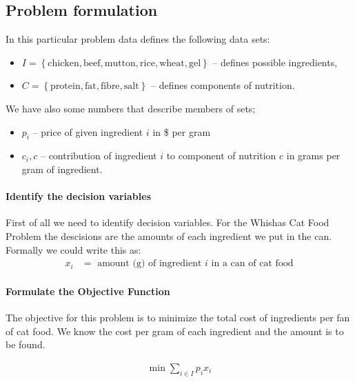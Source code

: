   
\subsection{Problem formulation}

In this particular problem data defines the following data sets:

\begin{itemize}
  \item $I = \left\{\text{chicken}, \text{beef}, \text{mutton}, \text{rice}, \text{wheat}, \text{gel}\right\}$ -- defines possible ingredients,
  \item $C = \left\{\text{protein}, \text{fat}, \text{fibre}, \text{salt}\right\}$ -- defines components of nutrition.
\end{itemize}

We have also some numbers that describe members of sets;
\begin{itemize}
  \item $p_i$ -- price of given ingredient $i$ in \$ per gram
  \item $c_i,c$ -- contribution of ingredient $i$ to component of nutrition $c$ in grams per gram of ingredient.
\end{itemize}

\paragraph{Identify the decision variables}

First of all we need to identify decision variables. For the Whishas Cat Food Problem the descisions are the amounts of each ingredient we put in the can. Formally we could write this as:
\begin{align} 
  x_i &= \text{ amount (g) of ingredient $i$  in a can of cat food}
\end{align} 

\paragraph{Formulate the Objective Function}

The objective for this problem is to minimize the total cost of ingredients per fan of cat food. We know the cost per gram of each ingredient and the amount is to be found.

\begin{align}
   \min \mathop\sum\limits_{i \in I} p_i x_i
\end{align}

